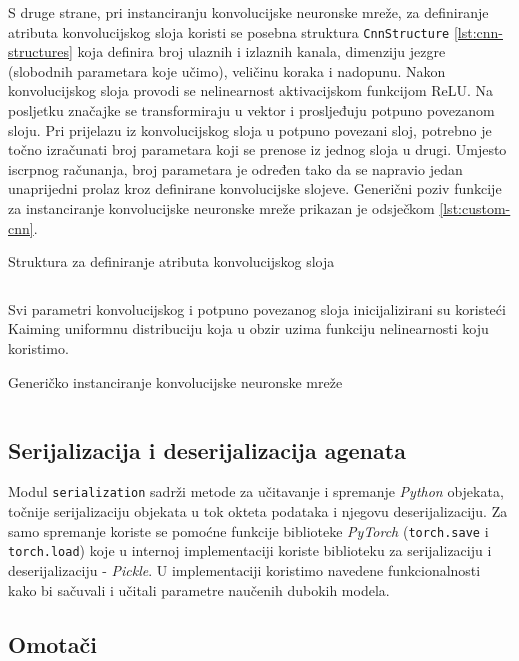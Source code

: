 S druge strane, pri instanciranju konvolucijske neuronske mreže, za definiranje atributa konvolucijskog sloja koristi se posebna struktura \texttt{CnnStructure} \ref{lst:cnn-structures} koja definira broj ulaznih i izlaznih kanala, dimenziju jezgre (slobodnih parametara koje učimo), veličinu koraka i nadopunu. Nakon konvolucijskog sloja provodi se nelinearnost aktivacijskom funkcijom ReLU. Na posljetku značajke se transformiraju u vektor i prosljeđuju potpuno povezanom sloju. Pri prijelazu iz konvolucijskog sloja u potpuno povezani sloj, potrebno je točno izračunati broj parametara koji se prenose iz jednog sloja u drugi. Umjesto iscrpnog računanja, broj parametara je određen tako da se napravio jedan unaprijedni prolaz kroz definirane konvolucijske slojeve. Generični poziv funkcije za instanciranje konvolucijske neuronske mreže prikazan je odsječkom \ref{lst:custom-cnn}. 

\begin{listing}[H]
    \caption{Struktura za definiranje atributa konvolucijskog sloja}
    \inputminted{python}{snippets/structures.py}
    \label{lst:cnn-structures}
\end{listing}

Svi parametri konvolucijskog i potpuno povezanog sloja inicijalizirani su koristeći Kaiming uniformnu distribuciju koja u obzir uzima funkciju nelinearnosti koju koristimo.

\begin{listing}[H]
    \caption{Generičko instanciranje konvolucijske neuronske mreže}
    \inputminted{python}{snippets/custom-cnn.py}
    \label{lst:custom-cnn}
\end{listing}

\subsection{Serijalizacija i deserijalizacija agenata}

Modul \texttt{serialization} sadrži metode za učitavanje i spremanje \textit{Python} objekata, točnije serijalizaciju objekata u tok okteta podataka  i njegovu deserijalizaciju. Za samo spremanje koriste se pomoćne funkcije biblioteke \textit{PyTorch} (\texttt{torch.save} i \texttt{torch.load}) koje u internoj implementaciji koriste biblioteku za serijalizaciju i deserijalizaciju - \textit{Pickle}. U implementaciji koristimo navedene funkcionalnosti kako bi sačuvali i učitali parametre naučenih dubokih modela. 

\subsection{Omotači}

